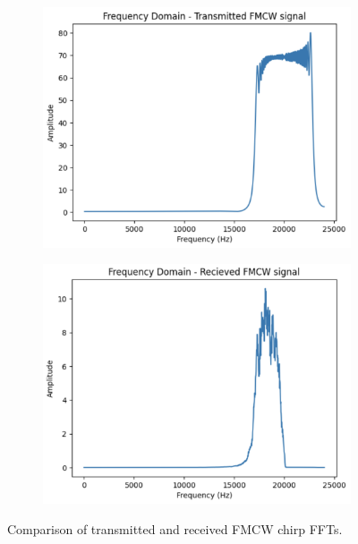 \documentclass{lab}
\begin{document}
\begin{figure}[h]
    \centering
    \begin{subfigure}[b]{0.48\textwidth}
        \centering
        \includegraphics[width=\textwidth]{images/transmittedFMCW.png}
    \end{subfigure}
    \hfill
    \begin{subfigure}[b]{0.48\textwidth}
        \centering
        \includegraphics[width=\textwidth]{images/receivedFMCW.png}
    \end{subfigure}
    \caption{Comparison of transmitted and received FMCW chirp FFTs.}
\end{figure}
\end{document}
